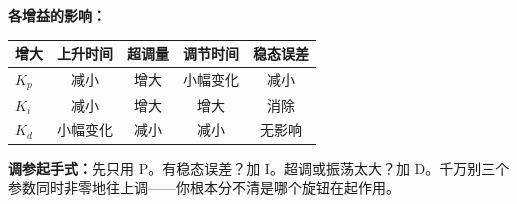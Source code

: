 \textbf{各增益的影响：}

\begin{center}
\begin{tabular}{lcccc}
\toprule
\textbf{增大} & \textbf{上升时间} & \textbf{超调量} & \textbf{调节时间} & \textbf{稳态误差} \\
\midrule
$K_p$ & 减小 & 增大 & 小幅变化 & 减小 \\
$K_i$ & 减小 & 增大 & 增大 & 消除 \\
$K_d$ & 小幅变化 & 减小 & 减小 & 无影响 \\
\bottomrule
\end{tabular}
\end{center}

\textbf{调参起手式：}先只用 P。有稳态误差？加 I。超调或振荡太大？加 D。千万别三个参数同时非零地往上调——你根本分不清是哪个旋钮在起作用。

